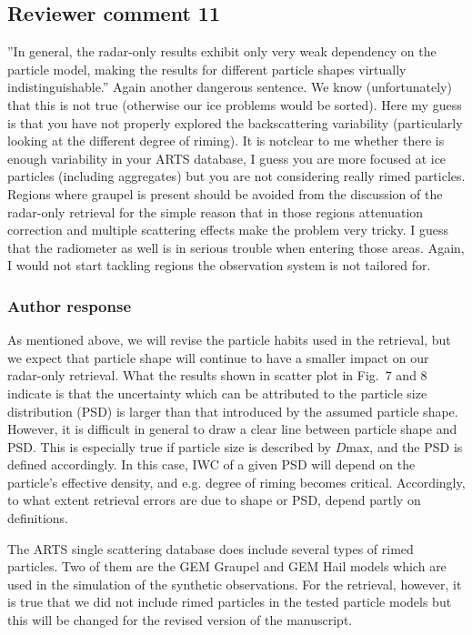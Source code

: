 \subsection*{Reviewer comment 11}

''In general, the radar-only results exhibit only very weak dependency on the
particle model, making the results for different particle shapes virtually
indistinguishable.'' Again another dangerous sentence. We know (unfortunately)
that this is not true (otherwise our ice problems would be sorted). Here my guess
is that you have not properly explored the backscattering variability
(particularly looking at the different degree of riming). It is notclear to me
whether there is enough variability in your ARTS database, I guess you are more
focused at ice particles (including aggregates) but you are not considering
really rimed particles. Regions where graupel is present should be avoided from
the discussion of the radar-only retrieval for the simple reason that in those
regions attenuation correction and multiple scattering effects make the problem
very tricky. I guess that the radiometer as well is in serious trouble when
entering those areas. Again, I would not start tackling regions the observation
system is not tailored for.

\subsubsection*{Author response}

As mentioned above, we will revise the particle habits used in the retrieval,
but we expect that particle shape will continue to have a smaller impact on our
radar-only retrieval. What the results shown in scatter plot in Fig.~7 and 8
indicate is that the uncertainty which can be attributed to the particle size
distribution (PSD) is larger than that introduced by the assumed particle shape.
However, it is difficult in general to draw a clear line between particle shape
and PSD. This is especially true if particle size is described by $D\text{max}$,
and the PSD is defined accordingly. In this case, IWC of a given PSD will depend
on the particle's effective density, and e.g. degree of riming becomes critical.
Accordingly, to what extent retrieval errors are due to shape or PSD, depend
partly on definitions.

The ARTS single scattering database does include several types of rimed
particles. Two of them are the GEM Graupel and GEM Hail models which are used in
the simulation of the synthetic observations. For the retrieval, however, it is
true that we did not include rimed particles in the tested particle models but this
will be changed for the revised version of the manuscript.

